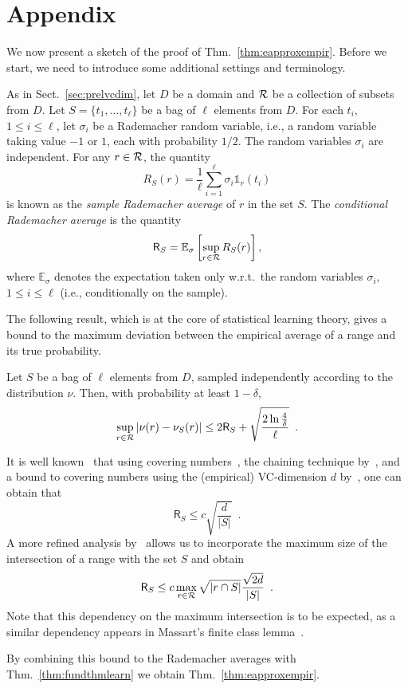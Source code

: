 \appendix
\section{Appendix}
We now present a sketch of the proof of Thm.~\ref{thm:eapproxempir}. Before we start, we
need to introduce some additional settings and terminology.

As in Sect.~\ref{sec:prelvcdim}, let $D$ be a domain and $\mathcal{R}$ be a
collection of subsets from $D$. Let $S=\{t_1,\dotsc,t_\ell\}$ be a bag of $\ell$
elements from $D$. For each $t_i$, $1\le i\le \ell$, let $\sigma_i$ be a
Rademacher random variable, i.e., a random variable taking value $-1$ or $1$,
each with probability $1/2$. The random variables $\sigma_i$ are independent.
For any $r\in\mathcal{R}$, the quantity
\[
	R_S(r)=\frac{1}{\ell}\sum_{i=1}^\ell \sigma_i\mathds{1}_r(t_i)
\]
is known as the \emph{sample Rademacher average} of $r$ in the set $S$. The
\emph{conditional Rademacher average} is the quantity
\[
	\mathsf{R}_S=\mathbb{E}_\sigma\left[\sup_{r\in\mathcal{R}}R_S(r)\right],
\]
where $\mathbb{E}_\sigma$ denotes the expectation taken only w.r.t.~the random
variables $\sigma_i$, $1\le i\le\ell$ (i.e., conditionally on the sample).

The following result, which is at the core of statistical learning theory, gives
a bound to the maximum deviation between the empirical average of a range and
its true probability.

\begin{theorem}\label{thm:fundthmlearn}
	Let $S$ be a bag of $\ell$ elements from $D$, sampled independently
	according to the distribution $\nu$.  Then, with probability at least
	$1-\delta$,
	\[
		\sup_{r\in\mathcal{R}}|\nu(r)-\nu_S(r)|\le 2 \mathsf{R}_S
		+\sqrt{\frac{2\ln\frac{4}{\delta}}{\ell}}\enspace.
	\]
\end{theorem}

It is well known~\citep[Sect.~1.4.6]{Lugosi02} that using covering
numbers~\citep{AnthonyB99}, the chaining technique by~\citet{Dudley84}, and a
bound to covering numbers using the (empirical) VC-dimension $d$
by~\citet{Haussler95}, one can obtain that
\[
	\mathsf{R}_S\le c\sqrt{\frac{d}{|S|}}\enspace.
\]
A more refined analysis by~\citet{SridharanTR} allows us to incorporate the
maximum size of the intersection of a range with the set $S$ and obtain
\[
	\mathsf{R}_S\le c\max_{r\in\mathcal{R}}\sqrt{|r\cap
	S|}\frac{\sqrt{2d}}{|S|}\enspace.
\]
Note that this dependency on the maximum intersection is to be expected, as a
similar dependency appears in Massart's finite class lemma~\citep[Lemma
26.8]{ShalevSBD14}.

By combining this bound to the Rademacher averages with
Thm.~\ref{thm:fundthmlearn} we obtain Thm.~\ref{thm:eapproxempir}.
